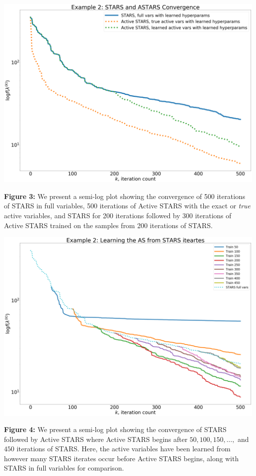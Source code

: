 \documentclass{amsart}
\begin{document}
\begin{center}


\includegraphics[scale=.14]{ex_2_pic_2} 

\textbf{Figure 3:} We present a semi-log plot showing the convergence of 500 iterations of STARS in full variables, 500 iterations of Active STARS with the exact or \textit{true} active variables, and STARS for 200 iterations followed by 300 iterations of Active STARS trained on the samples from 200 iterations of STARS.

\vspace{.5cm}

\includegraphics[scale=.14]{ex_2_pic_1}

\textbf{Figure 4:} We present a semi-log plot showing the convergence of STARS followed by Active STARS where Active STARS begins after $50,100,150,\ldots,$ and $450$ iterations of STARS. Here, the active variables have been learned from however many STARS iterates occur before Active STARS begins, along with STARS in full variables for comparison.

\end{center}
\end{document}

